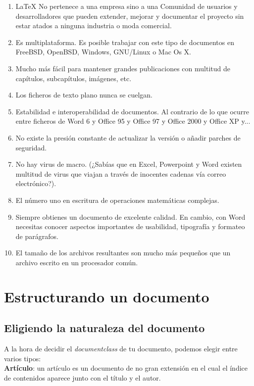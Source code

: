 \documentclass[11pt]{article}
\begin{document}
\begin{enumerate}
\item {\LaTeX} No pertenece a una empresa sino a una Comunidad de usuarios y desarrolladores que pueden extender, mejorar y documentar el proyecto sin estar atados a ninguna industria o moda comercial.
\item Es multiplataforma. Es posible trabajar con este tipo
de documentos en FreeBSD, OpenBSD, Windows, GNU/Linux o Mac
Os X.
\item Mucho más fácil para mantener grandes publicaciones con multitud de capítulos, subcapítulos, imágenes, etc.
\item Los ficheros de texto plano nunca se cuelgan.
\item Estabilidad e interoperabilidad de documentos. Al contrario de lo que ocurre entre ficheros de Word 6 y Office 95 y Office 97 y Office 2000 y Office XP y...
\item No existe la presión constante de actualizar la versión o añadir parches de seguridad.
\item No hay virus de macro. (¿Sabías que en Excel, Powerpoint y Word existen multitud de virus que viajan a través de inocentes cadenas vía correo electrónico?).
\item El número uno en escritura de operaciones matemáticas complejas.
\item Siempre obtienes un documento de excelente calidad. En cambio, con Word necesitas conocer aspectos importantes de usabilidad, tipografía y formateo de parágrafos.
\item El tamaño de los archivos resultantes son mucho más pequeños que un archivo escrito en un procesador común.
\end{enumerate}

\section{Estructurando un documento}

\subsection{Eligiendo la naturaleza del documento}

A la hora de decidir el {\em documentclass} de tu documento, podemos elegir entre varios tipos:\\

{\bfseries Artículo}: un artículo es un documento de no gran extensión en el cual el índice de contenidos aparece junto con el título y el autor.\\
\end{document}

